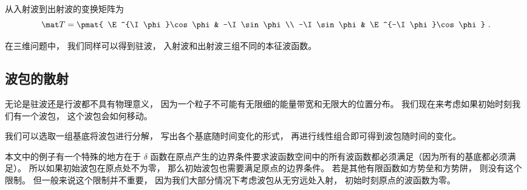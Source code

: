 从入射波到出射波的变换矩阵为
\begin{equation}
\mat T = \pmat{
\E^{\I\phi}\cos\phi & -\I \sin\phi \\
-\I \sin\phi & \E^{-\I\phi}\cos\phi
}~.\end{equation}

在三维问题中， 我们同样可以得到驻波， 入射波和出射波三组不同的本征波函数。

\subsection{波包的散射}
无论是驻波还是行波都不具有物理意义， 因为一个粒子不可能有无限细的能量带宽和无限大的位置分布。 我们现在来考虑如果初始时刻我们有一个波包， 这个波包会如何移动。

我们可以选取一组基底将波包进行分解， 写出各个基底随时间变化的形式， 再进行线性组合即可得到波包随时间的变化。

本文中的例子有一个特殊的地方在于 $\delta$ 函数在原点产生的边界条件要求波函数空间中的所有波函数都必须满足（因为所有的基底都必须满足）。 所以如果初始波包在原点处不为零， 那么初始波包也需要满足原点的边界条件。 若是其他有限函数如方势垒和方势阱， 则没有这个限制。 但一般来说这个限制并不重要， 因为我们大部分情况下考虑波包从无穷远处入射， 初始时刻原点的波函数为零。


